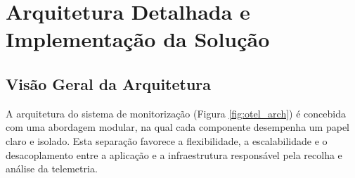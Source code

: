 \pagebreak

\section{Arquitetura Detalhada e Implementação da Solução}

\subsection{Visão Geral da Arquitetura}

A arquitetura do sistema de monitorização (Figura \ref{fig:otel_arch}) é concebida com uma abordagem modular, na qual cada componente desempenha um papel claro e isolado. Esta separação favorece a flexibilidade, a escalabilidade e o desacoplamento entre a aplicação e a infraestrutura responsável pela recolha e análise da telemetria.


